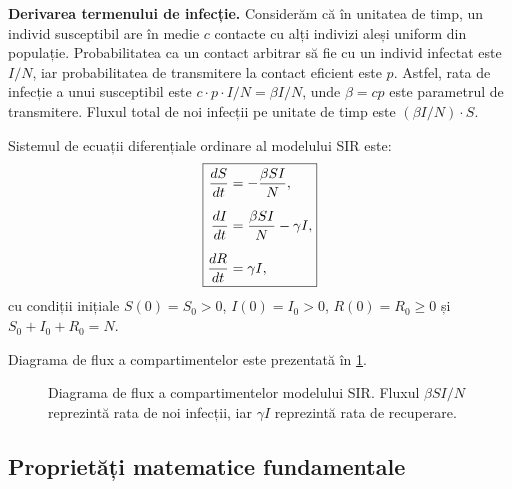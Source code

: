 \textbf{Derivarea termenului de infecție.} Considerăm că în unitatea de timp,
un individ susceptibil are în medie $c$ contacte cu alți indivizi aleși uniform
din populație. Probabilitatea ca un contact arbitrar să fie cu un individ infectat
este $I/N$, iar probabilitatea de transmitere la contact eficient este $p$. Astfel,
rata de infecție a unui susceptibil este $c \cdot p \cdot I/N = \beta I / N$, unde
$\beta = cp$ este parametrul de transmitere. Fluxul total de noi infecții pe unitate
de timp este $(\beta I / N) \cdot S$.

Sistemul de ecuații diferențiale ordinare al modelului SIR este:
\begin{equation}
\label{eq:sir}
\boxed{
\begin{aligned}
    \frac{dS}{dt} &= -\frac{\beta S I}{N}, \\[6pt]
    \frac{dI}{dt} &= \frac{\beta S I}{N} - \gamma I, \\[6pt]
    \frac{dR}{dt} &= \gamma I,
\end{aligned}
}
\end{equation}
cu condiții inițiale $S(0) = S_0 > 0$, $I(0) = I_0 > 0$, $R(0) = R_0 \geq 0$
și $S_0 + I_0 + R_0 = N$.

Diagrama de flux a compartimentelor este prezentată în
\cref{fig:sir_diagram}.

\begin{figure}[htbp]
\centering
{}
\caption[Diagrama modelului SIR]{Diagrama de flux a compartimentelor modelului SIR.
Fluxul $\beta SI/N$ reprezintă rata de noi infecții,
iar $\gamma I$ reprezintă rata de recuperare.}
\label{fig:sir_diagram}
\end{figure}

\subsection{Proprietăți matematice fundamentale}
\label{subsec:sir_proprietati}

